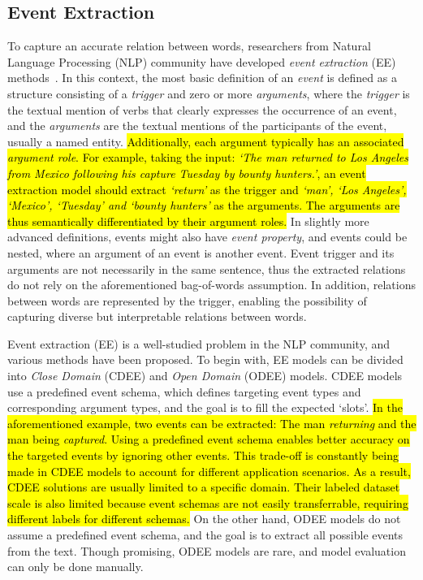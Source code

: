 \subsection{Event Extraction}\label{sec: ee}
To capture an accurate relation between words, researchers from Natural Language Processing (NLP) community have developed \textit{event extraction} (EE) methods~\cite{EESurveyBiomed}.
In this context, the most basic definition of an \textit{event} is defined as a structure consisting of a \textit{trigger} and zero or more \textit{arguments},
where the \textit{trigger} is the textual mention of verbs that clearly expresses the occurrence of an event,
and the \textit{arguments} are the textual mentions of the participants of the event, usually a named entity.
\hl{
Additionally, each argument typically has an associated \textit{argument role}.
For example, taking the input: \textit{`The man returned to Los Angeles from Mexico following his capture Tuesday by bounty hunters.'},
an event extraction model should extract \textit{`return'} as the trigger and \textit{`man', `Los Angeles', `Mexico', `Tuesday' and `bounty hunters'} as the arguments.
The arguments are thus semantically differentiated by their argument roles.
}
In slightly more advanced definitions, events might also have \textit{event property}, and events could be nested, where an argument of an event is another event.
Event trigger and its arguments are not necessarily in the same sentence, thus the extracted relations do not rely on the aforementioned bag-of-words assumption.
In addition, relations between words are represented by the trigger, enabling the possibility of capturing diverse but interpretable relations between words.

Event extraction (EE) is a well-studied problem in the NLP community, and various methods have been proposed.
To begin with, EE models can be divided into \textit{Close Domain} (CDEE) and \textit{Open Domain} (ODEE) models.
CDEE models use a predefined event schema, which defines targeting event types and corresponding argument types, and the goal is to fill the expected `slots'.
\hl{
In the aforementioned example, two events can be extracted: The man \textit{returning} and the man being \textit{captured}.
Using a predefined event schema enables better accuracy on the targeted events by ignoring other events.
This trade-off is constantly being made in CDEE models to account for different application scenarios.
As a result, CDEE solutions are usually limited to a specific domain.
Their labeled dataset scale is also limited because event schemas are not easily transferrable, requiring different labels for different schemas.
}
On the other hand, ODEE models do not assume a predefined event schema, and the goal is to extract all possible events from the text.
Though promising, ODEE models are rare, and model evaluation can only be done manually.

